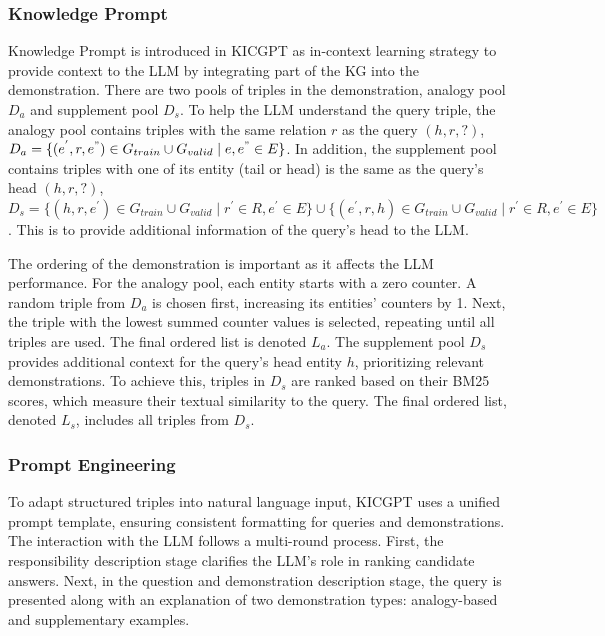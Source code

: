 \documentclass[12pt,a4paper]{article}
\begin{document}
\subsubsection{Knowledge Prompt}
Knowledge Prompt is introduced in KICGPT as in-context learning
strategy to provide context to the LLM by integrating part of the KG
into the demonstration. There are two pools of triples in the
demonstration, analogy pool \(D_a\) and supplement pool \(D_s\).
To help the LLM understand the query triple, the analogy pool contains
triples with the same relation \(r\) as the query \((h, r, ?)\),
\(D_a = \{(e^{'}, r, e^{"}) \in G_{train} \cup G_{valid} \mid e, e^{"} \in E\}\).
In addition, the supplement pool contains triples with one of its entity
(tail or head) is the same as the query's head \((h, r, ?)\),
\(D_s = \{(h, r, e^{'}) \in G_{train} \cup G_{valid} \mid r^{'} \in R, e^{'} \in E\} \cup
\{(e^{'}, r, h) \in G_{train} \cup G_{valid} \mid r^{'} \in R, e^{'} \in E\}\).
This is to provide additional information of the query's head to the LLM.

The ordering of the demonstration is important as it affects the LLM performance.
For the analogy pool, each entity starts with a zero counter.
A random triple from \(D_a\) is chosen first, increasing its entities'
counters by 1. Next, the triple with the lowest summed counter values
is selected, repeating until all triples are used. The final ordered
list is denoted \(L_a\). The supplement pool \(D_s\) provides additional context
for the query's head entity \(h\), prioritizing relevant demonstrations.
To achieve this, triples in \(D_s\) are ranked based on their BM25 scores,
which measure their textual similarity to the query. The final ordered list,
denoted \(L_s\), includes all triples from \(D_s\).

\subsubsection{Prompt Engineering}

To adapt structured triples into natural language input, KICGPT uses
a unified prompt template, ensuring consistent formatting for queries
and demonstrations. The interaction with the LLM follows a multi-round
process. First, the responsibility description stage clarifies the LLM's
role in ranking candidate answers. Next, in the question and demonstration
description stage, the query is presented along with an explanation of
two demonstration types: analogy-based and supplementary examples.
\end{document}
